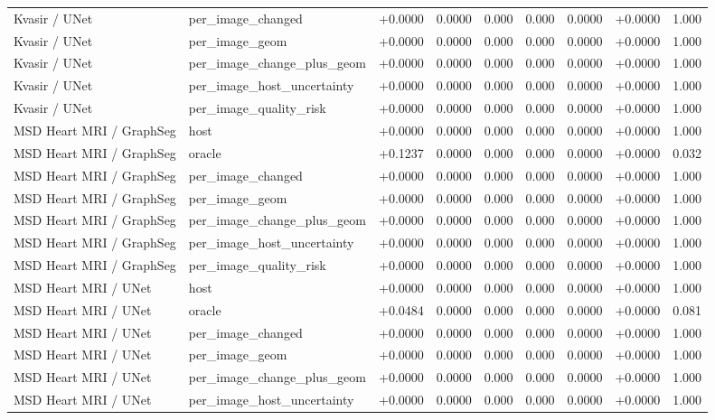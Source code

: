 \begin{table}[t]
\begin{tabular}{lllllllll}
Kvasir / UNet & per\_image\_changed & +0.0000 & 0.0000 & 0.000 & 0.000 & 0.0000 & +0.0000 & 1.000 \\
Kvasir / UNet & per\_image\_geom & +0.0000 & 0.0000 & 0.000 & 0.000 & 0.0000 & +0.0000 & 1.000 \\
Kvasir / UNet & per\_image\_change\_plus\_geom & +0.0000 & 0.0000 & 0.000 & 0.000 & 0.0000 & +0.0000 & 1.000 \\
Kvasir / UNet & per\_image\_host\_uncertainty & +0.0000 & 0.0000 & 0.000 & 0.000 & 0.0000 & +0.0000 & 1.000 \\
Kvasir / UNet & per\_image\_quality\_risk & +0.0000 & 0.0000 & 0.000 & 0.000 & 0.0000 & +0.0000 & 1.000 \\
MSD Heart MRI / GraphSeg & host & +0.0000 & 0.0000 & 0.000 & 0.000 & 0.0000 & +0.0000 & 1.000 \\
MSD Heart MRI / GraphSeg & oracle & +0.1237 & 0.0000 & 0.000 & 0.000 & 0.0000 & +0.0000 & 0.032 \\
MSD Heart MRI / GraphSeg & per\_image\_changed & +0.0000 & 0.0000 & 0.000 & 0.000 & 0.0000 & +0.0000 & 1.000 \\
MSD Heart MRI / GraphSeg & per\_image\_geom & +0.0000 & 0.0000 & 0.000 & 0.000 & 0.0000 & +0.0000 & 1.000 \\
MSD Heart MRI / GraphSeg & per\_image\_change\_plus\_geom & +0.0000 & 0.0000 & 0.000 & 0.000 & 0.0000 & +0.0000 & 1.000 \\
MSD Heart MRI / GraphSeg & per\_image\_host\_uncertainty & +0.0000 & 0.0000 & 0.000 & 0.000 & 0.0000 & +0.0000 & 1.000 \\
MSD Heart MRI / GraphSeg & per\_image\_quality\_risk & +0.0000 & 0.0000 & 0.000 & 0.000 & 0.0000 & +0.0000 & 1.000 \\
MSD Heart MRI / UNet & host & +0.0000 & 0.0000 & 0.000 & 0.000 & 0.0000 & +0.0000 & 1.000 \\
MSD Heart MRI / UNet & oracle & +0.0484 & 0.0000 & 0.000 & 0.000 & 0.0000 & +0.0000 & 0.081 \\
MSD Heart MRI / UNet & per\_image\_changed & +0.0000 & 0.0000 & 0.000 & 0.000 & 0.0000 & +0.0000 & 1.000 \\
MSD Heart MRI / UNet & per\_image\_geom & +0.0000 & 0.0000 & 0.000 & 0.000 & 0.0000 & +0.0000 & 1.000 \\
MSD Heart MRI / UNet & per\_image\_change\_plus\_geom & +0.0000 & 0.0000 & 0.000 & 0.000 & 0.0000 & +0.0000 & 1.000 \\
MSD Heart MRI / UNet & per\_image\_host\_uncertainty & +0.0000 & 0.0000 & 0.000 & 0.000 & 0.0000 & +0.0000 & 1.000 \\

\end{tabular}
\end{table}
